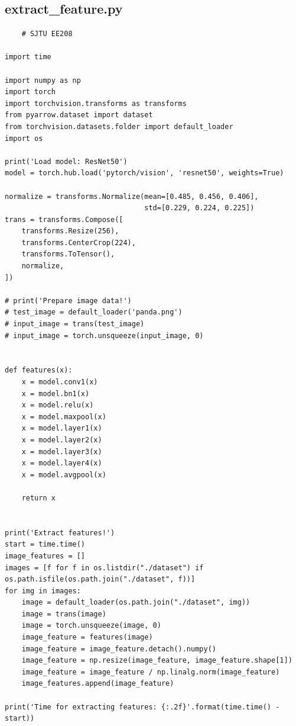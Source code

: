 \documentclass{article}
\begin{document}
\subsection{extract\_feature.py}
\begin{lstlisting}
    # SJTU EE208

import time

import numpy as np
import torch
import torchvision.transforms as transforms
from pyarrow.dataset import dataset
from torchvision.datasets.folder import default_loader
import os

print('Load model: ResNet50')
model = torch.hub.load('pytorch/vision', 'resnet50', weights=True)

normalize = transforms.Normalize(mean=[0.485, 0.456, 0.406],
                                 std=[0.229, 0.224, 0.225])
trans = transforms.Compose([
    transforms.Resize(256),
    transforms.CenterCrop(224),
    transforms.ToTensor(),
    normalize,
])

# print('Prepare image data!')
# test_image = default_loader('panda.png')
# input_image = trans(test_image)
# input_image = torch.unsqueeze(input_image, 0)


def features(x):
    x = model.conv1(x)
    x = model.bn1(x)
    x = model.relu(x)
    x = model.maxpool(x)
    x = model.layer1(x)
    x = model.layer2(x)
    x = model.layer3(x)
    x = model.layer4(x)
    x = model.avgpool(x)

    return x


print('Extract features!')
start = time.time()
image_features = []
images = [f for f in os.listdir("./dataset") if os.path.isfile(os.path.join("./dataset", f))]
for img in images:
    image = default_loader(os.path.join("./dataset", img))
    image = trans(image)
    image = torch.unsqueeze(image, 0)
    image_feature = features(image)
    image_feature = image_feature.detach().numpy()
    image_feature = np.resize(image_feature, image_feature.shape[1])
    image_feature = image_feature / np.linalg.norm(image_feature)
    image_features.append(image_feature)

print('Time for extracting features: {:.2f}'.format(time.time() - start))


\end{lstlisting}
\end{document}

